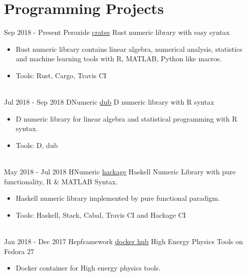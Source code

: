 \documentclass[letterpaper]{twentysecondcv} %
\begin{document}
\newpage

\makeprofiletwo
\section{Programming Projects}
\begin{twenty}
	\twentyitem
    	{Sep 2018 -}
		{Present}
        {Peroxide}
        {\href{https://crates.io/crates/peroxide}{crates}}
        {Rust numeric library with easy syntax}
        {\begin{itemize}
        \item Rust numeric library contains linear algebra, numerical analysis, statistics and machine learning tools with R, MATLAB, Python like macros.
        \item Tools: Rust, Cargo, Travis CI
		\end{itemize}
        }
        \\
    \twentyitem
    	{Jul 2018 -}
		{Sep 2018}
        {DNumeric}
        {\href{https://code.dlang.org/packages/dnumeric/}{dub}}
        {D numeric library with R syntax}
        {\begin{itemize}
        \item D numeric library for linear algebra and statistical programming with R syntax.
        \item Tools: D, dub
		\end{itemize}
        }
        \\
    \twentyitem
    	{May 2018 -}
		{Jul 2018}
        {HNumeric}
        {\href{https://hackage.haskell.org/package/HNumeric}{hackage}}
        {Haskell Numeric Library with pure functionality, R \& MATLAB Syntax.}
        {\begin{itemize}
        \item Haskell numeric library implemented by pure functional paradigm.
        
        \item Tools: Haskell, Stack, Cabal, Travis CI and Hackage CI
		\end{itemize}
        }
        \\
    \twentyitem
    	{Jan 2018 -}
		{Dec 2017}
        {Hepframework}
        {\href{https://hub.docker.com/r/axect/hepframework/}{docker hub}}
        {High Energy Physics Tools on Fedora 27}
        {\begin{itemize}
        \item Docker container for High energy physics tools.
        

\end{itemize}}
\end{twenty}
\end{document}
